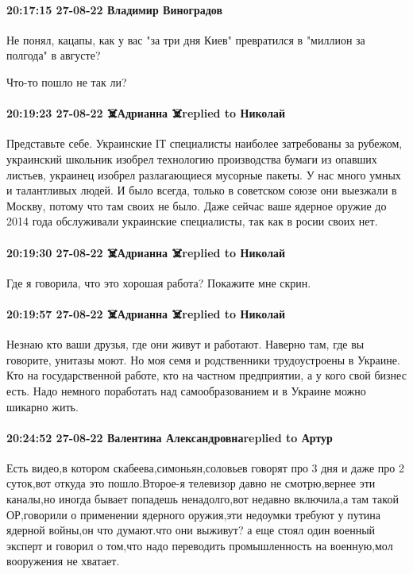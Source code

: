 \paragraph{20:17:15 27-08-22 Владимир Виноградов}

Не понял, кацапы, как у вас "за три дня Киев" превратился в "миллион за
полгода" в августе?

Что-то пошло не так ли?

\paragraph{20:19:23 27-08-22 ☠️Адрианна ☠️replied to Николай}

Представьте себе. Украинские ІТ специалисты наиболее затребованы за рубежом,
украинский школьник изобрел технологию производства бумаги из опавших листьев,
украинец изобрел разлагающиеся мусорные пакеты. У нас много умных и талантливых
людей. И было всегда, только в советском союзе они выезжали в Москву, потому
что там своих не было. Даже сейчас ваше ядерное оружие до 2014 года обслуживали
украинские специалисты, так как в росии своих нет.

\paragraph{20:19:30 27-08-22 ☠️Адрианна ☠️replied to Николай}

Где я говорила, что это хорошая работа? Покажите мне скрин.

\paragraph{20:19:57 27-08-22 ☠️Адрианна ☠️replied to Николай}

Незнаю кто ваши друзья, где они живут и работают. Наверно там, где вы говорите,
унитазы моют. Но моя семя и родственники трудоустроены в Украине. Кто на
государственной работе, кто на частном предприятии, а у кого свой бизнес есть.
Надо немного поработать над самообразованием и в Украине можно шикарно жить.

\paragraph{20:24:52 27-08-22 Валентина Александровнаreplied to Артур}

Есть видео,в котором скабеева,симоньян,соловьев говорят про 3 дня и даже про 2
суток,вот откуда это пошло.Второе-я телевизор давно не смотрю,вернее эти
каналы,но иногда бывает попадешь ненадолго,вот недавно включила,а там такой
ОР,говорили о применении ядерного оружия,эти недоумки требуют у путина ядерной
войны,он что думают.что они выживут? а еще стоял один военный эксперт и говорил
о том,что надо переводить промышленность на военную,мол вооружения не хватает.

